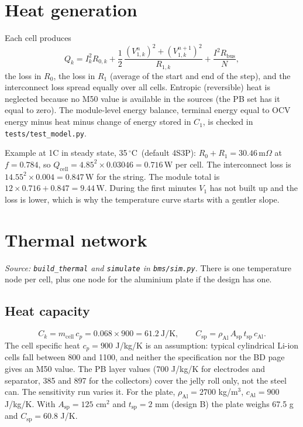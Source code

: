 \documentclass[11pt,a4paper]{article}
\newcommand{\degC}{\ensuremath{{}^{\circ}\mathrm{C}}}
\newcommand{\Rbus}{R_{\mathrm{bus}}}
\begin{document}
\section{Heat generation}\label{sec:heat}
Each cell produces
\begin{equation}
Q_k=I_k^{2}R_{0,k}+\frac{1}{2}\,\frac{(V_{1,k}^{n})^{2}+(V_{1,k}^{n+1})^{2}}{R_{1,k}}+\frac{I^{2}\Rbus}{N},
\end{equation}
the loss in $R_0$, the loss in $R_1$ (average of the start and end of the step), and the interconnect loss spread equally over all cells. Entropic (reversible) heat is neglected because no M50 value is available in the sources (the PB set has it equal to zero). The module-level energy balance, terminal energy equal to OCV energy minus heat minus change of energy stored in $C_1$, is checked in \texttt{tests/test\_model.py}.

Example at 1C in steady state, 35\,\degC\ (default 4S3P): $R_0+R_1=30.46$\,m$\Omega$ at $f=0.784$, so $Q_{\text{cell}}=4.85^{2}\times0.03046=0.716$\,W per cell. The interconnect loss is $14.55^{2}\times0.004=0.847$\,W for the string. The module total is $12\times0.716+0.847=9.44$\,W. During the first minutes $V_1$ has not built up and the loss is lower, which is why the temperature curve starts with a gentler slope.

\section{Thermal network}\label{sec:therm}
\emph{Source: \texttt{build\_thermal} and \texttt{simulate} in \texttt{bms/sim.py}.}
There is one temperature node per cell, plus one node for the aluminium plate if the design has one.

\subsection{Heat capacity}
\begin{equation}
C_k=m_{\mathrm{cell}}\,c_p=0.068\times900=61.2\ \mathrm{J/K},\qquad
C_{\mathrm{sp}}=\rho_{\mathrm{Al}}\,A_{\mathrm{sp}}\,t_{\mathrm{sp}}\,c_{\mathrm{Al}} .
\end{equation}
The cell specific heat $c_p=900$ J/kg/K is an assumption: typical cylindrical Li-ion cells fall between 800 and 1100, and neither the specification nor the BD page gives an M50 value. The PB layer values (700 J/kg/K for electrodes and separator, 385 and 897 for the collectors) cover the jelly roll only, not the steel can. The sensitivity run varies it. For the plate, $\rho_{\mathrm{Al}}=2700$ kg/m$^3$, $c_{\mathrm{Al}}=900$ J/kg/K. With $A_{\mathrm{sp}}=125$ cm$^2$ and $t_{\mathrm{sp}}=2$ mm (design B) the plate weighs 67.5 g and $C_{\mathrm{sp}}=60.8$ J/K.
\end{document}
